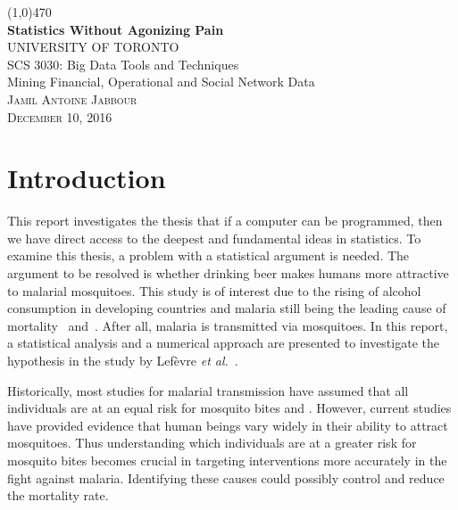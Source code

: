 




\begin{titlepage}
	\begin{center}
	\line(1,0){470}\\
	\Huge{\bfseries	 Statistics Without Agonizing Pain}\\
	[6cm]
    \textsc{ UNIVERSITY OF TORONTO}\\
    [1cm]
	\textmd{\large SCS 3030: Big Data Tools and Techniques\\
	 Mining Financial, Operational and Social Network Data}\\
	[6cm]
	\textsc{\large{Jamil Antoine Jabbour\\
			December 10, 2016 }}
	\end{center}
\end{titlepage}

\doublespace
\section{Introduction}
This report investigates the thesis that if a computer can be programmed, then we have direct access to the deepest and fundamental ideas in statistics. To examine this thesis, a problem with a statistical argument is needed. The argument to be resolved is whether drinking beer makes humans more attractive to malarial mosquitoes. This study is of interest due to the rising of alcohol consumption in developing countries and malaria still being the leading cause of mortality~\cite{feachem2008new} and~\cite{world2008}. After all, malaria is transmitted via mosquitoes. In this report, a statistical analysis and a numerical approach are presented to investigate the hypothesis in the study by Lef\`evre \textit{et al.}~\cite{lefevre2010beer}.

Historically, most studies for malarial transmission have assumed that all individuals are at an equal risk for mosquito bites \cite{MalriaHistory} and \cite{Mathbifurcation}. However, current studies have provided evidence that human beings vary widely in their ability to attract mosquitoes. Thus understanding which individuals are at a greater risk for mosquito bites becomes crucial in targeting interventions more accurately in the fight against malaria. Identifying these causes could possibly control and reduce the mortality rate.

